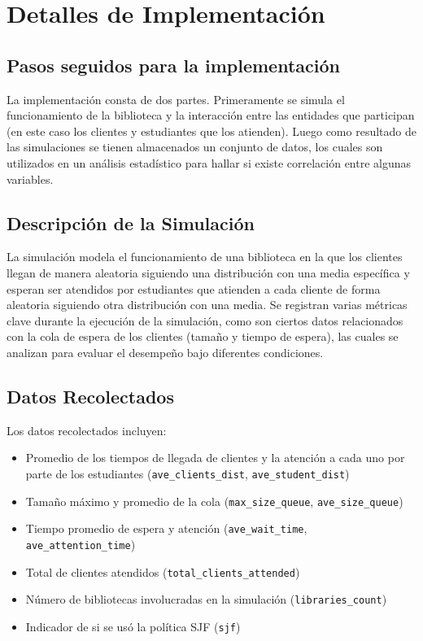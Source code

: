 \documentclass[10pt,twocolumn]{article}
\begin{document}

\section{Detalles de Implementación}

\subsection{Pasos seguidos para la implementación}
La implementación consta de dos partes. Primeramente se simula el funcionamiento de la biblioteca y la interacción entre las entidades que participan (en este caso los clientes y estudiantes que los atienden). Luego como resultado de las simulaciones se tienen almacenados un conjunto de datos, los cuales son utilizados en un análisis estadístico para hallar si existe correlación entre algunas variables.

\subsection{Descripción de la Simulación}
La simulación modela el funcionamiento de una biblioteca en la que los clientes llegan de manera aleatoria siguiendo una distribución con una media específica y esperan ser atendidos por estudiantes que atienden a cada cliente de forma aleatoria siguiendo otra distribución con una media. Se registran varias métricas clave durante la ejecución de la simulación, como son ciertos datos relacionados con la cola de espera de los clientes (tamaño y tiempo de espera), las cuales se analizan para evaluar el desempeño bajo diferentes condiciones.

\subsection{Datos Recolectados}
Los datos recolectados incluyen:
\begin{itemize}
	\item Promedio de los tiempos de llegada de clientes y la atención a cada uno por parte de los estudiantes (\texttt{ave\_clients\_dist}, \texttt{ave\_student\_dist})
	\item Tamaño máximo y promedio de la cola (\texttt{max\_size\_queue}, \texttt{ave\_size\_queue})
	\item Tiempo promedio de espera y atención (\texttt{ave\_wait\_time}, \texttt{ave\_attention\_time})
	\item Total de clientes atendidos (\texttt{total\_clients\_attended})
	\item Número de bibliotecas involucradas en la simulación (\texttt{libraries\_count})
	\item Indicador de si se usó la política SJF (\texttt{sjf})
\end{itemize}
\end{document}
